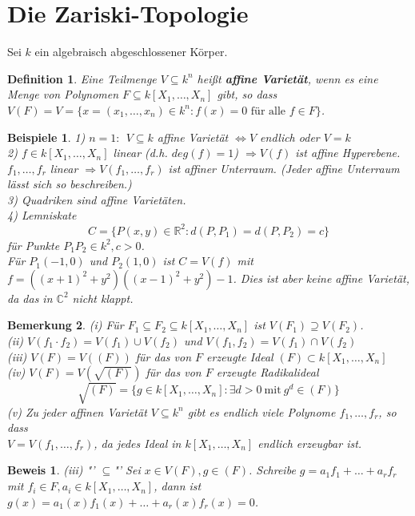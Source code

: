 \documentclass[a4paper,12pt]{report}
\theoremstyle{break}
\newtheorem{Def}{Definition}[section]
\newtheorem{Bem}[Def]{Bemerkung}
\theoremstyle{nonumberbreak}
\newtheorem{nnBsp}{Beispiele}
\theoremstyle{nonumberplain}
\newtheorem{Bew}{Beweis}
\newcommand{\emp}[1]{\textbf{\emph{#1}}}
\newcommand{\begriff}[1]{{\index{#1}}\emp{#1}}
\begin{document}
\section{Die Zariski-Topologie}
Sei $k$ ein algebraisch abgeschlossener Körper.
\begin{Def}
\label{def:2.1}
Eine Teilmenge $V\subseteq k^n$ heißt \begriff{affine Varietät}, wenn es eine Menge von Polynomen $F \subseteq k[X_1,\dots,X_n]$ gibt, so dass 
$V(F)=V= \{x= (x_1,\dots,x_n)\in k^n: f(x)=0 \textrm{~für~alle~} f \in F\}$.
\end{Def}
\begin{nnBsp}
1) $n=1:~~V\subseteq k$ affine Varietät $\Leftrightarrow V$ endlich oder $V=k$ \\
2) $f\in k[X_1,\dots,X_n]$ linear (d.h. $deg(f)=1$) $\Rightarrow V(f)$ ist affine Hyperebene.\\
$f_1,\dots,f_r$ linear $\Rightarrow V(f_1,\dots,f_r)$ ist affiner Unterraum. (Jeder affine Unterraum lässt sich so beschreiben.)\\
3) Quadriken sind affine Varietäten.\\
4) Lemniskate
$$C=\{P(x,y) \in \mathbb{R}^2: d(P,P_1)=d(P,P_2)=c\}$$
für Punkte $P_1P_2\in k^2, c>0$.\\
Für $P_1(-1,0)$ und $P_2(1,0)$ ist $C=V(f)$ mit $f=((x+1)^2+y^2)((x-1)^2+y^2)-1$.
Dies ist aber keine affine Varietät, da das in $\mathbb{C}^2$ nicht klappt.
\end{nnBsp}
\begin{Bem}
\label{bem:2.2}
(i) Für $F_1 \subseteq F_2 \subseteq k[X_1,\dots,X_n]$ ist $V(F_1)\supseteq V(F_2)$.\\
(ii) $V(f_1\cdot f_2)= V(f_1)\cup V(f_2)$ und $V(f_1,f_2)= V(f_1)\cap V(f_2)$\\
(iii) $V(F)=V((F))$ für das von $F$ erzeugte Ideal $(F)\subset k[X_1,\dots,X_n]$\\
(iv) $V(F)=V(\sqrt{(F)})$ für das von $F$ erzeugte Radikalideal
$$\sqrt{(F)}=\{g\in k[X_1,\dots,X_n]: \exists d>0 ~ \text{mit}~ g^d \in (F) \}$$
(v) Zu jeder affinen Varietät $V\subseteq k^n$ gibt es endlich viele Polynome $f_1,\dots,f_r$, so dass \\ $V=V(f_1,\dots,f_r)$, da jedes Ideal in $k[X_1,\dots,X_n]$ endlich erzeugbar ist.
\end{Bem}
\begin{Bew}
(iii) "' $\subseteq$"' Sei $x\in V(F), g\in (F)$. Schreibe $g=a_1f_1+\dots+a_rf_r$ mit $f_i \in F, a_i \in k[X_1,\dots,X_n]$, dann ist $g(x)=a_1(x)f_1(x)+\dots+a_r(x)f_r(x)=0$.
\end{Bew}
\end{document}
